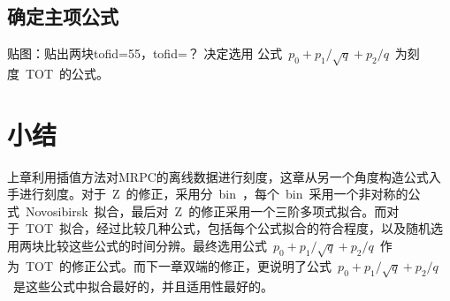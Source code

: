 \begin{comment}
\begin{table}[h]
    \centering
    \caption{\label{tbl:scint-detectors} 一些液闪探测器的属性}
  \footnotesize
    \begin{tabular}{lccccc}
        \hline
        探测器名称& 质量, kton  & PMT 数目 & 覆盖率 & p.e./\MeV & 时间 \\
                  & (模块数)    & (直径, cm) \\
        \hline
        KamLAND & 0.41 & 1325 (43) + 554 (51) & 34\% & 460 & 2002- \\
        Borexino & 0.1 & 2212 (20) & 30\% & 500 & 2007- \\
        SNO+ & 0.78 & 9438 (20) & 54\% & 400-900 & 2014- \\
        CHOOZ & 0.005 (Gd) & 192 (20) & 15\% & 130 & 1997-1998 \\
        Double Chooz & 0.017 (Gd) (2) & 534/module (20) & 13\% & 180 & 2011- \\
        Daya Bay & 0.160 (Gd) (8) & 192/module (20) & 5.6\% & 100 & 2011- \\
        RENO & 0.032 (Gd) (2) & 342/module (20) & 12.6\% & 100 & 2011- \\
        \hline
    \end{tabular}
\end{table}
\end{comment}
\subsection{确定主项公式}

贴图：贴出两块tofid=55，tofid=？
决定选用 公式~${p_{0}+p_{1}/\sqrt{q}+p_{2}/q}$~为刻度~TOT~的公式。

\section{小结}

上章利用插值方法对MRPC的离线数据进行刻度，这章从另一个角度构造公式入手进行刻度。对于~Z~的修正，采用分~bin~，每个~bin~采用一个非对称的公式~Novosibirsk~拟合，最后对~Z~的修正采用一个三阶多项式拟合。而对于~TOT~拟合，经过比较几种公式，包括每个公式拟合的符合程度，以及随机选用两块比较这些公式的时间分辨。最终选用公式~${p_{0}+p_{1}/\sqrt{q}+p_{2}/q}$~作为~TOT~的修正公式。而下一章双端的修正，更说明了公式~${p_{0}+p_{1}/\sqrt{q}+p_{2}/q}$~是这些公式中拟合最好的，并且适用性最好的。









